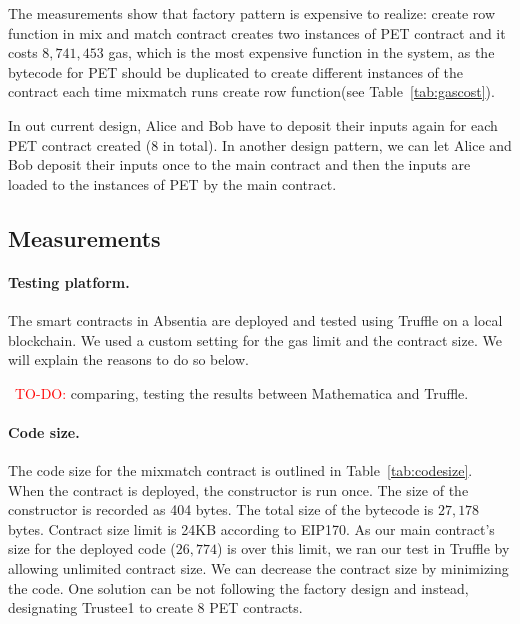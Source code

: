 The measurements show that factory pattern is expensive to realize: create row function in mix and match contract creates two instances of PET contract and it costs $8,741,453$ gas, which is the most expensive function in the system, as the bytecode for PET should be duplicated to create different instances of the contract each time mixmatch runs create row function(see Table~\ref{tab:gascost}). 

In out current design, Alice and Bob have to deposit their inputs again for each PET contract created (8 in total). In another design pattern, we can let Alice and Bob deposit their inputs once to the main contract and then the inputs are loaded to the instances of PET by the main contract. 


\subsection{Measurements}


\paragraph{Testing platform.} 
The smart contracts in Absentia are deployed and tested using Truffle on a local blockchain. We used a custom setting for the gas limit and the contract size. We will explain the reasons to do so below.

~\textcolor{red}{TO-DO:} comparing, testing the results between Mathematica and Truffle.




\paragraph{Code size.} 

The code size for the mixmatch contract is outlined in Table~\ref{tab:codesize}.  When the contract is deployed, the constructor is run once. The size of the constructor is recorded as 404 bytes. The total size of the bytecode is $27,178$ bytes. Contract size limit is 24KB according to EIP170. As our main contract's size for the deployed code ($26,774$) is over this limit, we ran our test in Truffle by allowing unlimited contract size. We can decrease the contract size by minimizing the code. One solution can be not following the factory design and instead, designating Trustee1 to create 8 PET contracts.


